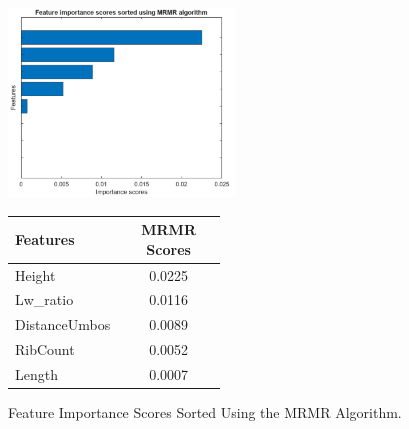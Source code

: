 \begin{figure}[!htbp]
	\centering
	\begin{minipage}{0.48\textwidth} 
		\centering
		\includegraphics[width=\textwidth, height=5cm]{figures/mrmr.png} 
	\end{minipage}%
	\hfill 
	\begin{minipage}{0.48\textwidth} 
		\centering
		{\fontsize{12}{15}\selectfont 
			\begin{tabular}{p{0.5\linewidth}c}
				\hline
				\textbf{Features} & \textbf{MRMR Scores} \\ \hline
				Height              & 0.0225  \\
				Lw\_ratio           & 0.0116  \\
				DistanceUmbos       & 0.0089  \\
				RibCount            & 0.0052  \\
				Length              & 0.0007  \\
				\hline
			\end{tabular}
		}
	\end{minipage}
	\caption{Feature Importance Scores Sorted Using the MRMR Algorithm.}
	\label{fig:mrmr-combined}
\end{figure}

